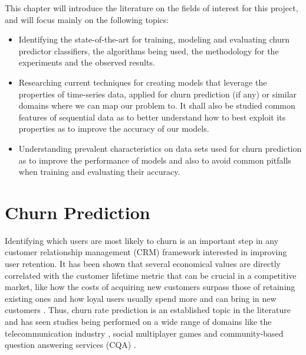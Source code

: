 \documentclass{kththesis}
\begin{document}
This chapter will introduce the literature on the fields of interest for this project, and will focus mainly on the following topics:

\begin{itemize}
\item Identifying the state-of-the-art for training, modeling and evaluating churn predictor classifiers, the algorithms being used, the methodology for the experiments and the observed results.

\item Researching current techniques for creating models that leverage the properties of time-series data, applied for churn prediction (if any) or similar domains where we can map our problem to. It shall also be studied common features of sequential data as to better understand how to best exploit its properties as to improve the accuracy of our models.

\item Understanding prevalent characteristics on data sets used for churn prediction as to improve the performance of models and also to avoid common pitfalls when training and evaluating their accuracy.
 
\end{itemize}


\section{Churn Prediction}

Identifying which users are most likely to churn is an important step in any customer relationship management (CRM) framework interested in improving user retention. It has been shown that several economical values are directly correlated with the customer lifetime metric that can be crucial in a competitive market, like how the costs of acquiring new customers surpass those of retaining existing ones and how loyal users usually spend more and can bring in new customers \citep{GurAli2014}. Thus, churn rate prediction is an established topic in the literature and has seen studies being performed on a wide range of domains like the telecommunication industry \citep{Lu2014}\citep{Khan2015}\citep{Hassouna2015}, social multiplayer games \citep{Borbora2011}\citep{Runge2014} and community-based question answering services (CQA) \citep{Pudipeddi2014}\citep{Dror2012}. 
\end{document}
